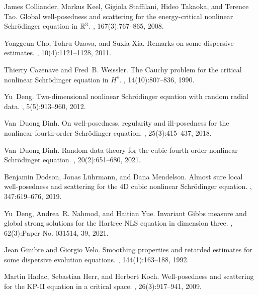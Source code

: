 \documentclass[aihp]{imsart}
\numberwithin{equation}{section}
\theoremstyle{plain}
\theoremstyle{remark}
\begin{document}
\begin{thebibliography}{}
James Colliander, Markus Keel, Gigiola Staffilani, Hideo Takaoka, and Terence
  Tao.
\newblock Global well-posedness and scattering for the energy-critical
  nonlinear {S}chr\"{o}dinger equation in {$\Bbb R^3$}.
, 167(3):767--865, 2008.

Yonggeun Cho, Tohru Ozawa, and Suxia Xia.
\newblock Remarks on some dispersive estimates.
, 10(4):1121--1128, 2011.

Thierry Cazenave and Fred~B. Weissler.
\newblock The {C}auchy problem for the critical nonlinear {S}chr\"{o}dinger
  equation in {$H^s$}.
, 14(10):807--836, 1990.

Yu~Deng.
\newblock Two-dimensional nonlinear {S}chr\"{o}dinger equation with random
  radial data.
, 5(5):913--960, 2012.

Van~Duong Dinh.
\newblock On well-posedness, regularity and ill-posedness for the nonlinear
  fourth-order {S}chr\"{o}dinger equation.
, 25(3):415--437, 2018.

Van~Duong Dinh.
\newblock Random data theory for the cubic fourth-order nonlinear
  {S}chr\"{o}dinger equation.
, 20(2):651--680, 2021.

Benjamin Dodson, Jonas L\"{u}hrmann, and Dana Mendelson.
\newblock Almost sure local well-posedness and scattering for the 4{D} cubic
  nonlinear {S}chr\"{o}dinger equation.
, 347:619--676, 2019.

Yu~Deng, Andrea~R. Nahmod, and Haitian Yue.
\newblock Invariant {G}ibbs measure and global strong solutions for the
  {H}artree {NLS} equation in dimension three.
, 62(3):Paper No. 031514, 39, 2021.

Jean Ginibre and Giorgio Velo.
\newblock Smoothing properties and retarded estimates for some dispersive
  evolution equations.
, 144(1):163--188, 1992.

Martin Hadac, Sebastian Herr, and Herbert Koch.
\newblock Well-posedness and scattering for the {KP}-{II} equation in a
  critical space.
,
  26(3):917--941, 2009.


\end{thebibliography}
\end{document}
